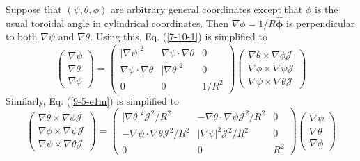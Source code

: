 \documentclass{article}
\newcommand{\tmmathbf}[1]{\ensuremath{\boldsymbol{#1}}}
\begin{document}
Suppose that $(\psi, \theta, \phi)$ are arbitrary general coordinates except
that $\phi$ is the usual toroidal angle in cylindrical coordinates. Then
$\nabla \phi = 1 / R \hat{\tmmathbf{\phi}}$ is perpendicular to both $\nabla
\psi$ and $\nabla \theta$. Using this, Eq. (\ref{7-10-1}) is simplified to
\begin{equation}
  \label{4-13-p3} \left(\begin{array}{c}
    \nabla \psi\\
    \nabla \theta\\
    \nabla \phi
  \end{array}\right) = \left(\begin{array}{ccc}
    | \nabla \psi |^2 & \nabla \psi \cdot \nabla \theta & 0\\
    \nabla \psi \cdot \nabla \theta & | \nabla \theta |^2 & 0\\
    0 & 0 & 1 / R^2
  \end{array}\right) \left(\begin{array}{c}
    \nabla \theta \times \nabla \phi \mathcal{J}\\
    \nabla \phi \times \nabla \psi \mathcal{J}\\
    \nabla \psi \times \nabla \theta \mathcal{J}
  \end{array}\right)
\end{equation}
Similarly, Eq. (\ref{9-5-e1m}) is simplified to
\begin{equation}
  \label{4-13-p4} \left(\begin{array}{c}
    \nabla \theta \times \nabla \phi \mathcal{J}\\
    \nabla \phi \times \nabla \psi \mathcal{J}\\
    \nabla \psi \times \nabla \theta \mathcal{J}
  \end{array}\right) = \left(\begin{array}{ccc}
    | \nabla \theta |^2 \mathcal{J}^2 / R^2 & - \nabla \theta \cdot \nabla
    \psi \mathcal{J}^2 / R^2 & 0\\
    - \nabla \psi \cdot \nabla \theta \mathcal{J}^2 / R^2 & | \nabla \psi |^2
    \mathcal{J}^2 / R^2 & 0\\
    0 & 0 & R^2
  \end{array}\right) \left(\begin{array}{c}
    \nabla \psi\\
    \nabla \theta\\
    \nabla \phi
  \end{array}\right)
\end{equation}
\end{document}
